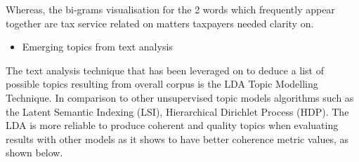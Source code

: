 Whereas, the bi-grams visualisation for the 2 words which frequently appear together are tax service related on matters taxpayers needed clarity on.

\begin{itemize}
    \item Emerging topics from text analysis
\end{itemize}

The text analysis technique that has been leveraged on to deduce a list of possible topics resulting from overall corpus is the LDA Topic Modelling Technique.  In comparison to other unsupervised topic models algorithms such as the Latent Semantic Indexing (LSI), Hierarchical Dirichlet Process (HDP).  The LDA is more reliable to produce coherent and quality topics when evaluating results with other models as it shows to have better coherence metric values, as shown below.\\

